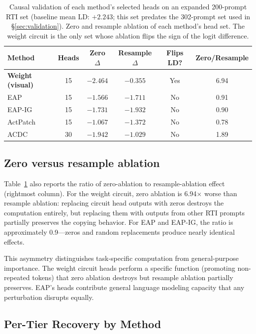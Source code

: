 \documentclass{article}
\begin{document}
\begin{table}[h]
\centering
\caption{Causal validation of each method's selected heads on an
expanded 200-prompt RTI set (baseline mean LD: $+2.243$; this set
predates the 302-prompt set used in \S\ref{sec:validation}). Zero and
resample ablation of each method's head set. The weight circuit is the
only set whose ablation flips the sign of the logit difference.}
\label{tab:methods}
\begin{tabular}{lccccc}
\toprule
\textbf{Method} & \textbf{Heads} & \textbf{Zero $\Delta$} & \textbf{Resample $\Delta$} & \textbf{Flips LD?} & \textbf{Zero/Resample} \\
\midrule
\textbf{Weight (visual)} & 15 & $-2.464$ & $-0.355$ & Yes & 6.94 \\
EAP & 15 & $-1.566$ & $-1.711$ & No & 0.91 \\
EAP-IG & 15 & $-1.731$ & $-1.932$ & No & 0.90 \\
ActPatch & 15 & $-1.067$ & $-1.372$ & No & 0.78 \\
ACDC & 30 & $-1.942$ & $-1.029$ & No & 1.89 \\
\bottomrule
\end{tabular}
\end{table}

\subsection{Zero versus resample ablation}

Table~\ref{tab:methods} also reports the ratio of zero-ablation to
resample-ablation effect (rightmost column). For the weight circuit,
zero ablation is 6.94$\times$ worse than resample ablation: replacing
circuit head outputs with zeros destroys the computation entirely, but
replacing them with outputs from other RTI prompts partially preserves
the copying behavior. For EAP and EAP-IG, the ratio is approximately
0.9---zeros and random replacements produce nearly identical effects.

This asymmetry distinguishes task-specific computation from
general-purpose importance. The weight circuit heads perform a specific
function (promoting non-repeated tokens) that zero ablation destroys but
resample ablation partially preserves. EAP's heads contribute general
language modeling capacity that any perturbation disrupts equally.

\subsection{Per-Tier Recovery by Method}
\end{document}
